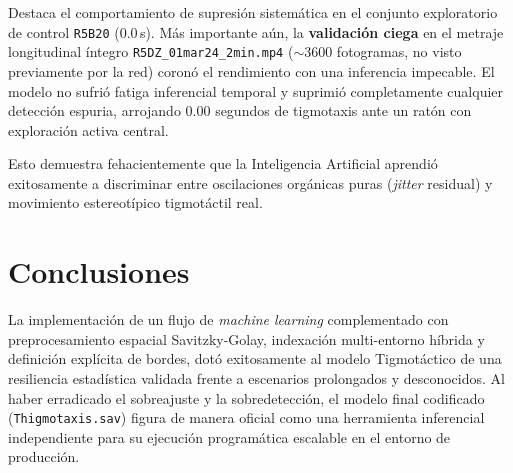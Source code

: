 \documentclass[12pt,a4paper]{article}
\begin{document}
\begin{table}[H]
\centering
\caption{Aplicación del Modelo Thigmotaxis.sav sobre Set Híbrido}
\end{table}

Destaca el comportamiento de supresión sistemática en el conjunto exploratorio de control \texttt{R5B20} ($0.0$\,s). Más importante aún, la \textbf{validación ciega} en el metraje longitudinal íntegro \texttt{R5DZ\_01mar24\_2min.mp4} ($\sim3600$ fotogramas, no visto previamente por la red) coronó el rendimiento con una inferencia impecable. El modelo no sufrió fatiga inferencial temporal y suprimió completamente cualquier detección espuria, arrojando $0.00$ segundos de tigmotaxis ante un ratón con exploración activa central. 

Esto demuestra fehacientemente que la Inteligencia Artificial aprendió exitosamente a discriminar entre oscilaciones orgánicas puras (\textit{jitter} residual) y movimiento estereotípico tigmotáctil real.

\section{Conclusiones}
La implementación de un flujo de \textit{machine learning} complementado con preprocesamiento espacial Savitzky-Golay, indexación multi-entorno híbrida y definición explícita de bordes, dotó exitosamente al modelo Tigmotáctico de una resiliencia estadística validada frente a escenarios prolongados y desconocidos. Al haber erradicado el sobreajuste y la sobredetección, el modelo final codificado (\texttt{Thigmotaxis.sav}) figura de manera oficial como una herramienta inferencial independiente para su ejecución programática escalable en el entorno de producción.
\end{document}
